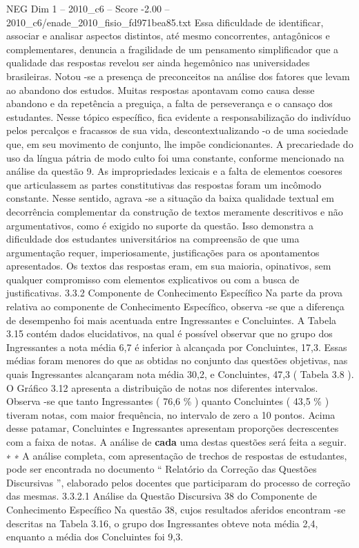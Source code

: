 \begin{textsample}{NEG Dim 1 – 2010\_c6 – Score -2.00 – 2010\_c6/enade\_2010\_fisio\_fd971bea85.txt}
Essa dificuldade de identificar, associar e analisar aspectos distintos, até mesmo concorrentes, antagônicos e complementares, denuncia a fragilidade de um pensamento simplificador que a qualidade das respostas revelou ser ainda hegemônico nas universidades brasileiras.
Notou -se a presença de preconceitos na análise dos fatores que levam ao abandono dos estudos.
Muitas respostas apontavam como causa desse abandono e da repetência a preguiça, a falta de perseverança e o cansaço dos estudantes.
Nesse tópico específico, fica evidente a responsabilização do indivíduo pelos percalços e fracassos de sua vida, descontextualizando -o de uma sociedade que, em seu movimento de conjunto, lhe impõe condicionantes.
A precariedade do uso da língua pátria de modo culto foi uma constante, conforme mencionado na análise da questão 9.
As impropriedades lexicais e a falta de elementos coesores que articulassem as partes constitutivas das respostas foram um incômodo constante.
Nesse sentido, agrava -se a situação da baixa qualidade textual em decorrência complementar da construção de textos meramente descritivos e não argumentativos, como é exigido no suporte da questão.
Isso demonstra a dificuldade dos estudantes universitários na compreensão de que uma argumentação requer, imperiosamente, justificações para os apontamentos apresentados.
Os textos das respostas eram, em sua maioria, opinativos, sem qualquer compromisso com elementos explicativos ou com a busca de justificativas. 3.3.2 Componente de Conhecimento Específico Na parte da prova relativa ao componente de Conhecimento Específico, observa -se que a diferença de desempenho foi mais acentuada entre Ingressantes e Concluintes.
A Tabela 3.15 contém dados elucidativos, na qual é possível observar que no grupo dos Ingressantes a nota média 6,7 é inferior à alcançada por Concluintes, 17,3.
Essas médias foram menores do que as obtidas no conjunto das questões objetivas, nas quais Ingressantes alcançaram nota média 30,2, e Concluintes, 47,3 ( Tabela 3.8 ).
O Gráfico 3.12 apresenta a distribuição de notas nos diferentes intervalos.
Observa -se que tanto Ingressantes ( 76,6 \% ) quanto Concluintes ( 43,5 \% ) tiveram notas, com maior frequência, no intervalo de zero a 10 pontos.
Acima desse patamar, Concluintes e Ingressantes apresentam proporções decrescentes com a faixa de notas.
A análise de \textbf{cada} uma destas questões será feita a seguir. ∗ ∗ A análise completa, com apresentação de trechos de respostas de estudantes, pode ser encontrada no documento “ Relatório da Correção das Questões Discursivas ”, elaborado pelos docentes que participaram do processo de correção das mesmas. 3.3.2.1 Análise da Questão Discursiva 38 do Componente de Conhecimento Específico Na questão 38, cujos resultados aferidos encontram -se descritas na Tabela 3.16, o grupo dos Ingressantes obteve nota média 2,4, enquanto a média dos Concluintes foi 9,3.

\end{textsample}
